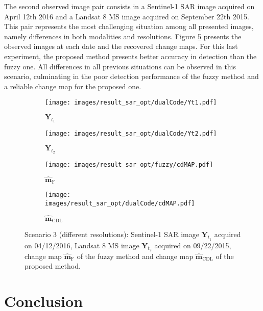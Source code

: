 \documentclass[review]{elsarticle}
\begin{document}
The second observed image pair consists in a Sentinel-1 SAR image acquired on April 12th 2016 and a Landsat 8 MS image acquired on September 22th 2015. This pair represents the most challenging situation among all presented images, namely differences in both modalities and resolutions. Figure \ref{fig:realS1S2_1} presents the observed images at each date and the recovered change maps. For this last experiment, the proposed method presents better accuracy in detection than the fuzzy one. All differences in all previous situations can be observed in this scenario, culminating in the poor detection performance of the fuzzy method and a reliable change map for the proposed one.

\begin{figure}[h!]
\centering
			\begin{subfigure}{\subfwidth}
					\centering	
					\texttt{[image: images/result\_sar\_opt/dualCode/Yt1.pdf]}
					\caption{$\mathbf{Y}_{t_1}$}
					\label{fig:s1s2Yt1_1}
			\end{subfigure}
			\begin{subfigure}{\subfwidth}
					\centering	
					\texttt{[image: images/result\_sar\_opt/dualCode/Yt2.pdf]}
					\caption{$\mathbf{Y}_{t_2}$}
					\label{fig:s1s2Yt2_1}
			\end{subfigure}
            \begin{subfigure}{\subfwidth}
					\centering
					\texttt{[image: images/result\_sar\_opt/fuzzy/cdMAP.pdf]}
					\caption{$\hat{\mathbf{m}}_{\mathrm{F}}$}
					\label{fig:s1s2FMAP_1}
			\end{subfigure}
			\begin{subfigure}{\subfwidth}
					\centering	
					\texttt{[image: images/result\_sar\_opt/dualCode/cdMAP.pdf]}
					\caption{$\hat{\mathbf{m}}_{\mathrm{CDL}}$}
					\label{fig:s1s2DCMAP_1}
			\end{subfigure}
\caption{Scenario 3 (different resolutions): \protect{}  Sentinel-1 SAR image $\mathbf{Y}_{t_1}$ acquired on 04/12/2016, \protect{}  Landsat 8 MS image $\mathbf{Y}_{t_2}$ acquired on 09/22/2015, \protect{} change map $\hat{\mathbf{m}}_{\mathrm{F}}$ of the fuzzy method and \protect{} change map $\hat{\mathbf{m}}_{\mathrm{CDL}}$ of the proposed method.}%
	\label{fig:realS1S2_1}%
\end{figure}

\section{Conclusion}
\label{sec:conclusion}
\end{document}
